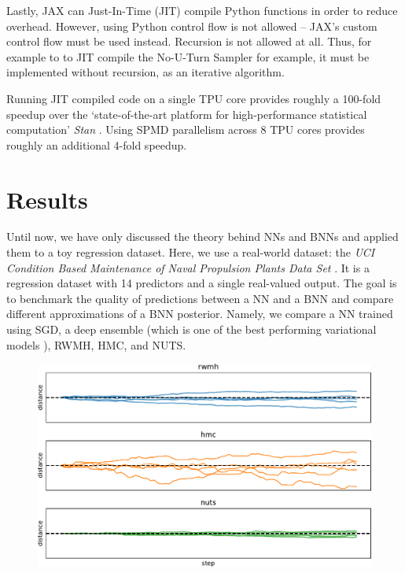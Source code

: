 \documentclass[12pt]{article}
\begin{document}
{Lastly, JAX can Just-In-Time (JIT) compile Python functions in order to reduce overhead. However, using Python control flow is not allowed -- JAX's custom control flow must be used instead. Recursion is not allowed at all. Thus, for example to to JIT compile the No-U-Turn Sampler for example, it must be implemented without recursion, as an iterative algorithm.

Running JIT compiled code on a single TPU core provides roughly a 100-fold speedup over the `state-of-the-art platform for high-performance statistical computation' \textit{Stan} \cite{stan}. Using SPMD parallelism across 8 TPU cores provides roughly an additional 4-fold speedup.

\section{Results}
\label{sec_results}

Until now, we have only discussed the theory behind NNs and BNNs and applied them to a toy regression dataset. Here, we use a real-world dataset: the \textit{UCI Condition Based Maintenance of Naval Propulsion Plants Data Set} \cite{uci}. It is a regression dataset with 14 predictors and a single real-valued output. The goal is to benchmark the quality of predictions between a NN and a BNN and compare different approximations of a BNN posterior. Namely, we compare a NN trained using SGD, a deep ensemble (which is one of the best performing variational models \cite{bnn_posterior}), RWMH, HMC, and NUTS.



\begin{figure}[ht]
\centering
\includegraphics[width=16cm]{plots/uci_param_history.pdf}
\caption{}
\label{fig_uci_param_history}
\end{figure}

}
\end{document}
